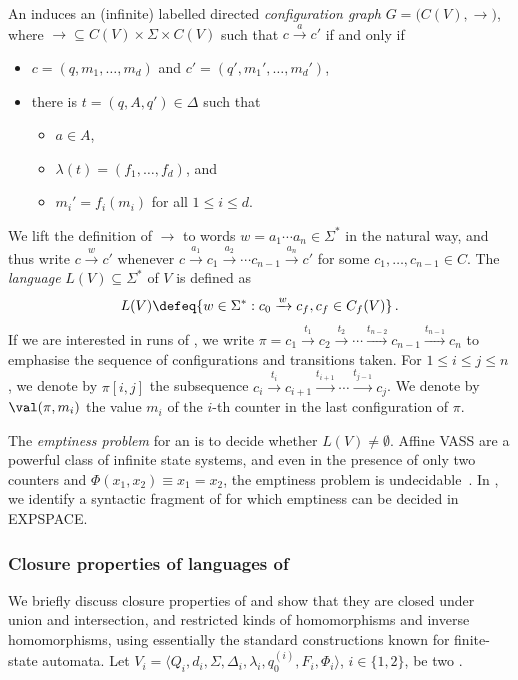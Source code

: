 An \laVASS induces an (infinite) labelled directed \emph{configuration
  graph} ${G=(C(V),\xrightarrow{}})$, where ${\xrightarrow{}}
\subseteq C(V)\times \Sigma \times C(V)$ such that $c\xrightarrow{a}
c'$ if and only if
%
\begin{itemize}
\item $c=(q,m_1,\ldots,m_d)$ and $c'=(q',m_1',\ldots,m_d')$,
\item there is $t=(q,A,q')\in \Delta$ such that
  \begin{itemize}
  \item $a\in A$,
  \item $\lambda(t)=(f_1,\ldots,f_d)$, and
  \item $m_i'=f_i(m_i)$ for all $1\le i\le d$.
  \end{itemize}
\end{itemize}
%
We lift the definition of $\xrightarrow{}$ to words $w=a_1\cdots a_n
\in \Sigma^*$ in the natural way, and thus write $c\xrightarrow{w}c'$
whenever $c \xrightarrow{a_1} c_1 \xrightarrow{a_2} \cdots c_{n-1}
\xrightarrow{a_n} c'$ for some $c_1,\ldots,c_{n-1} \in C$. The
\emph{language} $L(V) \subseteq \Sigma^*$ of $V$ is defined as
\[
L(V) \defeq \{ w \in \Sigma^* : c_0 \xrightarrow{w} c_f, c_f \in C_f(V)
\}\,.
\]
%
If we are interested in runs of \laVASS, we write $\pi = c_1\xrightarrow{t_1} c_2\xrightarrow{t_2}
\cdots \xrightarrow{t_{n-2}}c_{n-1} \xrightarrow{t_{n-1}} c_n$ to emphasise the sequence of configurations and 
transitions taken. For $1\le i\le j\le n$, we denote by $\pi[i,j]$ the
subsequence $c_i\xrightarrow{t_i} c_{i+1}\xrightarrow{t_{i+1}} \cdots \xrightarrow{t_{j-1}}c_j$. We denote by
$\val(\pi,m_i)$ the value $m_i$ of the $i$-th counter in the last configuration of $\pi$.

The \emph{emptiness problem} for an \laVASS is to decide whether
$L(V)\neq \emptyset$. Affine VASS are a powerful class of infinite
state systems, and even in the presence of only two counters and
$\Phi(x_1,x_2) \equiv x_1 = x_2$, the emptiness problem is
undecidable~\cite{Reichert2015}.  In , we
identify a syntactic fragment of \laVASS for which emptiness can be
decided in EXPSPACE.


\subsubsection*{Closure properties of languages of \laVASS}

We briefly discuss closure properties of \laVASS and show that they
are closed under union and intersection, and restricted kinds of
homomorphisms and inverse homomorphisms, using essentially the
standard constructions known for finite-state automata. Let
$V_i=\langle Q_i,d_i,
\Sigma,\Delta_i,\lambda_i,q_0^{(i)},F_i,\Phi_i\rangle$, $i\in
\{1,2\}$, be two \laVASS.

